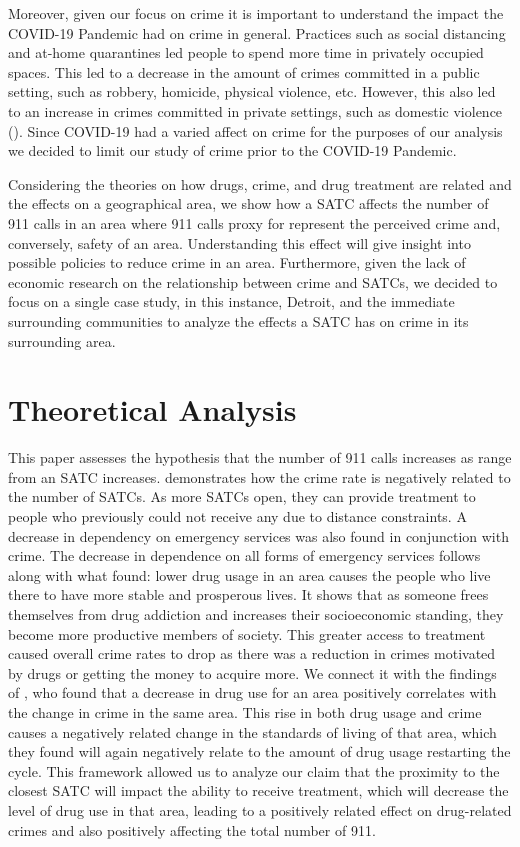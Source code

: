 \documentclass[12pt]{article}
\begin{document}
Moreover, given our focus on crime it is important to understand the impact the COVID-19 Pandemic had on crime in general. Practices such as social distancing and at-home quarantines led people to spend more time in privately occupied spaces. This led to a decrease in the amount of crimes committed in a public setting, such as robbery, homicide, physical violence, etc. However, this also led to an increase in crimes committed in private settings, such as domestic violence (\cite{covid_and_crime}). Since COVID-19 had a varied affect on crime for the purposes of our analysis we decided to limit our study of crime prior to the COVID-19 Pandemic.

Considering the theories on how drugs, crime, and drug treatment are related and the effects on a geographical area, we show how a SATC affects the number of 911 calls in an area where 911 calls proxy for represent the perceived crime and, conversely, safety of an area. Understanding this effect will give insight into possible policies to reduce crime in an area. Furthermore, given the lack of economic research on the relationship between crime and SATCs, we decided to focus on a single case study, in this instance, Detroit, and the immediate surrounding communities to analyze the effects a SATC has on crime in its surrounding area. 

\section{Theoretical Analysis}
\label{sec:theory}
This paper assesses the hypothesis that the number of 911 calls increases as range from an SATC increases. \cite{SAT_centers_and_crime} demonstrates how the crime rate is negatively related to the number of SATCs. As more SATCs open, they can provide treatment to people who previously could not receive any due to distance constraints. A decrease in dependency on emergency services was also found in conjunction with crime. The decrease in dependence on all forms of emergency services follows along with what \cite{Socioeconomic-Determinants} found: lower drug usage in an area causes the people who live there to have more stable and prosperous lives. It shows that as someone frees themselves from drug addiction and increases their socioeconomic standing, they become more productive members of society. This greater access to treatment caused overall crime rates to drop as there was a reduction in crimes motivated by drugs or getting the money to acquire more. We connect it with the findings of \cite{drugs_and_crime}, who found that a decrease in drug use for an area positively correlates with the change in crime in the same area. This rise in both drug usage and crime causes a negatively related change in the standards of living of that area, which they found will again negatively relate to the amount of drug usage restarting the cycle. This framework allowed us to analyze our claim that the proximity to the closest SATC will impact the ability to receive treatment, which will decrease the level of drug use in that area, leading to a positively related effect on drug-related crimes and also positively affecting the total number of 911.
\end{document}
